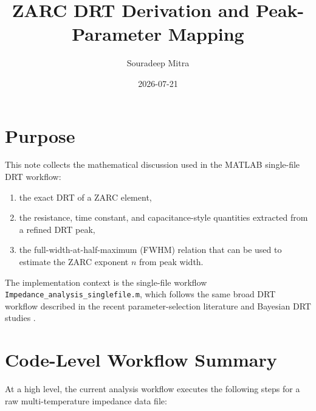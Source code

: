 \documentclass[11pt]{article}
\title{ZARC DRT Derivation and Peak-Parameter Mapping}
\author{Souradeep Mitra}
\date{2026-07-21}
\begin{document}
\maketitle

\section{Purpose}

This note collects the mathematical discussion used in the MATLAB single-file DRT workflow:

\begin{enumerate}
\item the exact DRT of a ZARC element,
\item the resistance, time constant, and capacitance-style quantities extracted from a refined DRT peak,
\item the full-width-at-half-maximum (FWHM) relation that can be used to estimate the ZARC exponent $n$ from peak width.
\end{enumerate}

The implementation context is the single-file workflow \texttt{Impedance\_analysis\_singlefile.m}, which follows the same broad DRT workflow described in the recent parameter-selection literature and Bayesian DRT studies \cite{maradesa2023,carbone2025,ciucci2015,danzer2019}.

\section{Code-Level Workflow Summary}

At a high level, the current analysis workflow executes the following steps for a raw multi-temperature impedance data file:
\end{document}

